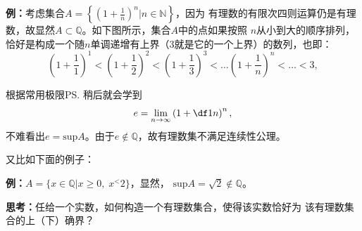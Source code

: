 	{\bf 例：}考虑集合$A=\left\{\left(1+\frac 1n\right)^n|n\in\mathbb{N}\right\}$，因为
	有理数的有限次四则运算仍是有理数，故显然$A\subset\mathbb{Q}$。如下图所示，集合$A$中的点如果按照
	$n$从小到大的顺序排列，恰好是构成一个随$n$单调递增有上界（$3$就是它的一个上界）的数列，也即：
	$$\left(1+\frac11\right)^1<\left(1+\frac12\right)^2<\left(1+\frac13\right)^3<\ldots
	\left(1+\frac1n\right)^n<\ldots<3,$$
	\begin{center}
	\end{center}
	根据常用极限\ps{稍后就会学到}
	$$e=\lim\limits_{n\to\infty}\left(1+\df1n\right)^n,$$
	不难看出$e=\mathrm{sup}A$。由于$e\notin\mathbb{Q}$，故有理数集不满足连续性公理。
	
	又比如下面的例子：
	
	{\bf 例：}$A=\{x\in\mathbb{Q}|x\geq 0,\;x^<2\}$，显然，
	$\mathrm{sup}A=\sqrt2\notin\mathbb{Q}$。
	
	{\bf 思考：}任给一个实数，如何构造一个有理数集合，使得该实数恰好为
	该有理数集合的上（下）确界？
	
